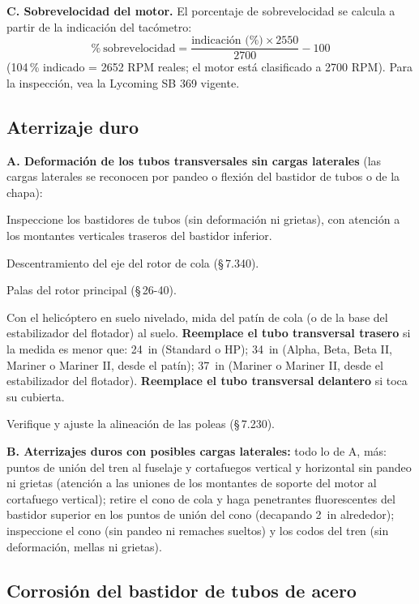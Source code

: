 \textbf{C. Sobrevelocidad del motor.} El porcentaje de sobrevelocidad se calcula a partir de la indicación del tacómetro:
\[
\%\ \text{sobrevelocidad} = \frac{\text{indicación (\%)} \times 2550}{2700} - 100
\]
(104\,\% indicado = 2652 RPM reales; el motor está clasificado a 2700 RPM). Para la inspección, vea la Lycoming SB 369 vigente.

\subsection{Aterrizaje duro}

\textbf{A. Deformación de los tubos transversales sin cargas laterales} (las cargas laterales se reconocen por pandeo o flexión del bastidor de tubos o de la chapa):
\begin{pasos}
\item Inspeccione los bastidores de tubos (sin deformación ni grietas), con atención a los montantes verticales traseros del bastidor inferior.
\item Descentramiento del eje del rotor de cola (\S\,7.340).
\item Palas del rotor principal (\S\,26-40).
\item Con el helicóptero en suelo nivelado, mida del patín de cola (o de la base del estabilizador del flotador) al suelo. \textbf{Reemplace el tubo transversal trasero} si la medida es menor que: 24~in (Standard o HP); 34~in (Alpha, Beta, Beta II, Mariner o Mariner II, desde el patín); 37~in (Mariner o Mariner II, desde el estabilizador del flotador). \textbf{Reemplace el tubo transversal delantero} si toca su cubierta.
\item Verifique y ajuste la alineación de las poleas (\S\,7.230).
\end{pasos}

\textbf{B. Aterrizajes duros con posibles cargas laterales:} todo lo de A, más: puntos de unión del tren al fuselaje y cortafuegos vertical y horizontal sin pandeo ni grietas (atención a las uniones de los montantes de soporte del motor al cortafuego vertical); retire el cono de cola y haga penetrantes fluorescentes del bastidor superior en los puntos de unión del cono (decapando 2~in alrededor); inspeccione el cono (sin pandeo ni remaches sueltos) y los codos del tren (sin deformación, mellas ni grietas).

\subsection{Corrosión del bastidor de tubos de acero}

